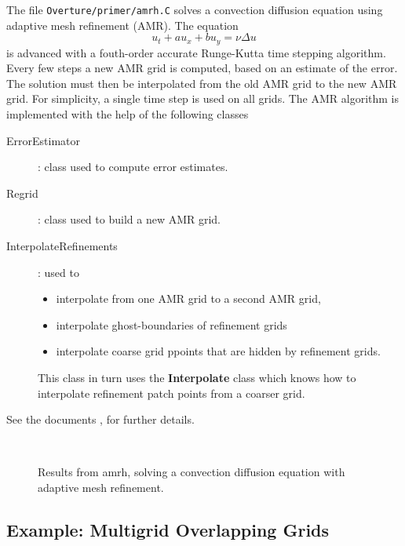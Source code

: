 \documentclass{article}
\begin{document}
The file {\tt Overture/primer/amrh.C} solves a convection diffusion equation
using adaptive mesh refinement (AMR). The equation
\[
    u_t + a u_x + b u_y = \nu \Delta u
\]
is advanced with a fouth-order accurate Runge-Kutta time stepping algorithm.
Every few steps a new AMR grid is computed, based on an estimate of the error.
The solution must then be interpolated from the old AMR grid to the new AMR grid.
For simplicity, a single time step is used on all grids.
The AMR algorithm is implemented with the help of the following classes
\begin{description}
  \item[ErrorEstimator] : class used to compute error estimates.
  \item[Regrid] : class used to build a new AMR grid.
  \item[InterpolateRefinements] : used to 
     \begin{itemize}
        \item interpolate from one AMR grid to a second AMR grid, 
        \item interpolate ghost-boundaries of refinement grids
        \item interpolate coarse grid ppoints that are hidden by refinement grids.
     \end{itemize}
     This class in turn uses the {\bf Interpolate} class which knows how to interpolate
     refinement patch points from a coarser grid.
\end{description}
See the documents \cite{amrGuide},\cite{Interpolate} for further details.

\begin{figure}
  \begin{center}
   \\
  \caption{Results from amrh, solving a convection diffusion equation with adaptive mesh refinement.}
  \end{center} \label{fig:hypeAMR}
\end{figure}

\vfill\eject
\subsection{Example: Multigrid Overlapping Grids}
\end{document}
